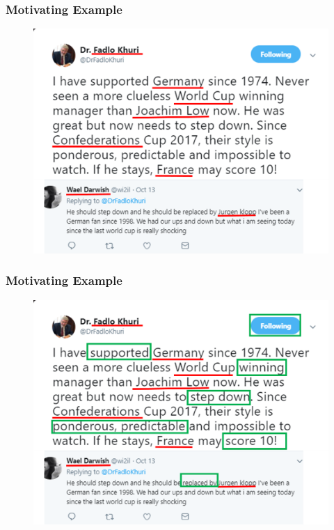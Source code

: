 \documentclass[xcolor=table]{beamer}
\begin{document}
\begin{frame}
\frametitle{Motivating Example}
\begin{figure}[!htb]
   \centering
    \includegraphics[scale=0.5]{img0004_1.png}
    
\end{figure}

\end{frame}

\begin{frame}
\frametitle{Motivating Example}
\begin{figure}[!htb]
   \centering
    \includegraphics[scale=0.5]{img0004_2.png}
    
\end{figure}
\end{frame}
\end{document}
